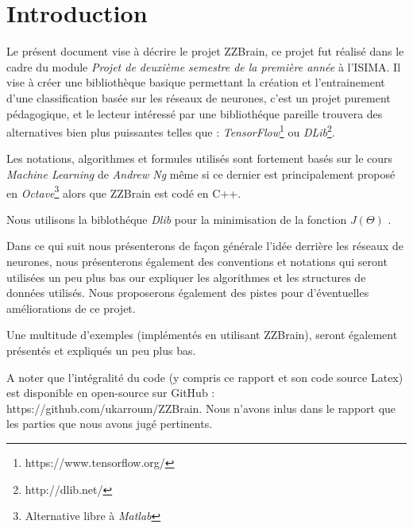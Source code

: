\section{Introduction}

Le présent document vise à décrire le projet ZZBrain, ce projet fut réalisé dans le cadre du module \textit{Projet de deuxième semestre de la première année} à l'ISIMA. Il vise à créer une bibliothèque basique permettant la création et l'entrainement d'une classification basée sur les réseaux de neurones, c'est un projet purement pédagogique, et le lecteur intéressé par une bibliothéque pareille trouvera des alternatives bien plus puissantes telles que : \textit{TensorFlow}\footnote{https://www.tensorflow.org/} ou \textit{DLib}\footnote{http://dlib.net/}.


Les notations, algorithmes et formules utilisés sont fortement basés sur le cours \textit{Machine Learning} de \textit{Andrew Ng}\cite{machine-course} même si ce dernier est principalement proposé en \textit{Octave}\footnote{Alternative libre à \textit{Matlab}} alors que ZZBrain est codé en C++\cite{cpp}.


Nous utilisons la biblothéque \textit{Dlib}\cite{dlib} pour la minimisation de la fonction $J(\Theta)$ .


Dans ce qui suit nous présenterons de façon générale l'idée derrière les réseaux de neurones, nous présenterons également des conventions et notations qui seront utilisées un peu plus bas our expliquer les algorithmes et les structures de données utilisés.
Nous proposerons également des pistes pour d'éventuelles améliorations de ce projet.


Une multitude d'exemples (implémentés en utilisant ZZBrain), seront également présentés et expliqués un peu plus bas.

A noter que l'intégralité du code (y compris ce rapport et son code source Latex) est disponible en open-source sur GitHub : https://github.com/ukarroum/ZZBrain.
Nous n'avons inlus dans le rapport que les parties que nous avons jugé pertinents.
